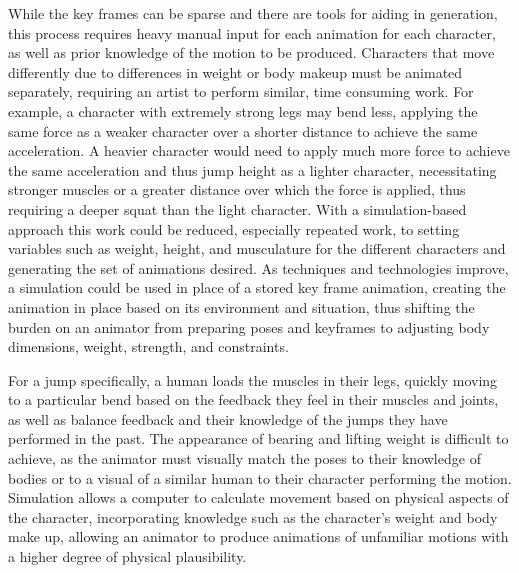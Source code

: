 While the key frames can be sparse and there are tools for aiding in generation, this process requires heavy manual input for each animation for each character, as well as prior knowledge of the motion to be produced.  Characters that move differently due to differences in weight or body makeup must be animated separately, requiring an artist to perform similar, time consuming work.  For example, a character with extremely strong legs may bend less, applying the same force as a weaker character over a shorter distance to achieve the same acceleration.  A heavier character would need to apply much more force to achieve the same acceleration and thus jump height as a lighter character, necessitating stronger muscles or a greater distance over which the force is applied, thus requiring a deeper squat than the light character.  With a simulation-based approach this work could be reduced, especially repeated work, to setting variables such as weight, height, and musculature for the different characters and generating the set of animations desired.  As techniques and technologies improve, a simulation could be used in place of a stored key frame animation, creating the animation in place based on its environment and situation, thus shifting the burden on an animator from preparing poses and keyframes to adjusting body dimensions, weight, strength, and constraints.

For a jump specifically, a human loads the muscles in their legs, quickly moving to a particular bend based on the feedback they feel in their muscles and joints, as well as balance feedback and their knowledge of the jumps they have performed in the past.  The appearance of bearing and lifting weight is difficult to achieve, as the animator must visually match the poses to their knowledge of bodies or to a visual of a similar human to their character performing the motion.  Simulation allows a computer to calculate movement based on physical aspects of the character, incorporating knowledge such as the character's weight and body make up, allowing an animator to produce animations of unfamiliar motions with a higher degree of physical plausibility.


